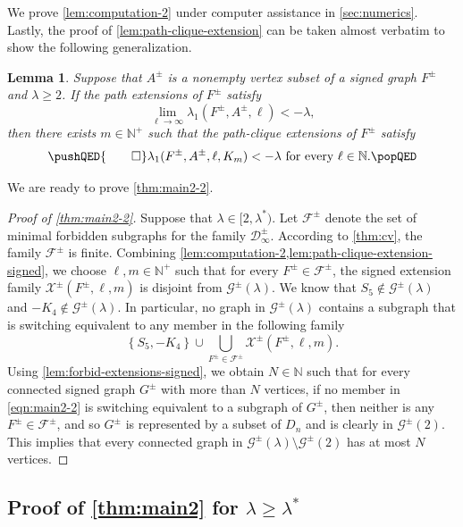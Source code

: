 \documentclass[11pt]{article}
\newtheorem{lemma}[theorem]{Lemma}
\theoremstyle{definition}
\theoremstyle{remark}
\newcommand{\sset}[1]{\left\{{#1}\right\}}
\newcommand{\la}{\lambda}
\newcommand{\D}{\mathcal{D}}
\newcommand{\F}{\mathcal{F}}
\newcommand{\G}{\mathcal{G}}
\newcommand{\N}{\mathbb{N}}
\newcommand{\X}{\mathcal{X}}
\newcommand{\Gs}{\G^\pm(\la)}
\begin{document}
We prove \cref{lem:computation-2} under computer assistance in \cref{sec:numerics}. Lastly, the proof of \cref{lem:path-clique-extension} can be taken almost verbatim to show the following generalization.

\begin{lemma} \label{lem:path-clique-extension-signed}
    Suppose that $A^\pm$ is a nonempty vertex subset of a signed graph $F^\pm$ and $\la \ge 2$. If the path extensions of $F^\pm$ satisfy
    \[
        \lim_{\ell \to \infty} \la_1(F^\pm, A^\pm, \ell) < -\la,
    \]
    then there exists $m \in \N^+$ such that the path-clique extensions of $F^\pm$ satisfy
    \[
        \pushQED{\qed}
        \la_1(F^\pm, A^\pm, \ell, K_m) < -\la \text{ for every }\ell \in \N.\qedhere
        \popQED
    \]
\end{lemma}

We are ready to prove \cref{thm:main2-2}.

\begin{proof}[Proof of \cref{thm:main2-2}]
    Suppose that $\la \in [2, \la^*)$. Let $\F^\pm$ denote the set of minimal forbidden subgraphs for the family $\D^\pm_\infty$. According to \cref{thm:cv}, the family $\F^\pm$ is finite. Combining \cref{lem:computation-2,lem:path-clique-extension-signed}, we choose $\ell, m \in \N^+$ such that for every $F^\pm \in \F^\pm$, the signed extension family $\X^\pm(F^\pm, \ell, m)$ is disjoint from $\Gs$. We know that $S_5 \not\in \Gs$ and $-K_4 \not\in \Gs$. In particular, no graph in $\Gs$ contains a subgraph that is switching equivalent to any member in the following family
    \begin{equation} \label{eqn:main2-2}
        \sset{S_5, -K_4} \cup \bigcup_{F^\pm \in \F^\pm} \X^\pm(F^\pm, \ell, m).
    \end{equation}
    Using \cref{lem:forbid-extensions-signed}, we obtain $N \in \N$ such that for every connected signed graph $G^\pm$ with more than $N$ vertices, if no member in \eqref{eqn:main2-2} is switching equivalent to a subgraph of $G^\pm$, then neither is any $F^\pm \in \F^\pm$, and so $G^\pm$ is represented by a subset of $D_n$ and is clearly in $\G^\pm(2)$. This implies that every connected graph in $\Gs \setminus \G^\pm(2)$ has at most $N$ vertices.
\end{proof}

\subsection{Proof of \texorpdfstring{\cref{thm:main2}}{the second main theorem} for \texorpdfstring{$\la \ge \la^*$}{λ ≥ λ*}}
\end{document}
